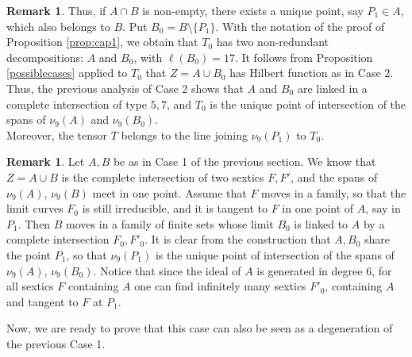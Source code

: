 \documentclass{amsart}
\theoremstyle{definition}
\newtheorem{rem0}[thm0]{Remark}
\begin{document}
\begin{rem0} Thus, if $A\cap B$ is non-empty, there exists a unique point, say $P_1\in A$, which also belongs to $B$. Put $B_0=B\setminus\{P_1\}$.
With the notation of the proof of Proposition \ref{prop:cap1}, we obtain that $T_0$ has two non-redundant decompositions: $A$ and $B_0$, with
$\ell(B_0)=17$. It follows from Proposition \ref{possiblecases} applied to $T_0$ that $Z=A\cup B_0$ has Hilbert function as in Case 2. Thus,  the previous
analysis of Case 2 shows that $A$ and $B_0$ are linked in a complete intersection of type $5,7$, and $T_0$ is the unique point of intersection
of the spans of $\nu_9(A)$ and $\nu_9(B_0)$.\\
Moreover, the tensor $T$ belongs to the line joining $\nu_9(P_1)$ to $T_0$.
\end{rem0}

\begin{rem0} \label{tangency} Let $A,B$ be as in Case 1 of the previous section. We know that $Z=A\cup B$ is the complete intersection of two sextics $F,F'$,
and the spans of $\nu_9(A)$, $\nu_9(B)$ meet in one point. Assume that $F$ moves in a family, so that the limit curves $F_0$ is still irreducible,
and it is tangent to $F$ in one point of $A$, say in $P_1$. Then $B$ moves in a family of finite sets whose limit $B_0$ is linked to $A$ by a complete intersection
$F_0,F'_0$. It is clear from the construction that  $A,B_0$ share the point $P_1$, so that $ \nu_{9}(P_{1}) $ is the unique point of intersection
of the spans of $\nu_9(A)$, $\nu_9(B_0)$. 
Notice that since the ideal of $A$ is generated in degree $6$, for all sextics $F$ containing $A$ one can find infinitely many sextics $F'_0$, containing $A$ and
tangent to $F$ at $P_1$.
\end{rem0}

Now, we are ready to prove that this case can also be seen as a degeneration of the previous Case 1.
\end{document}
